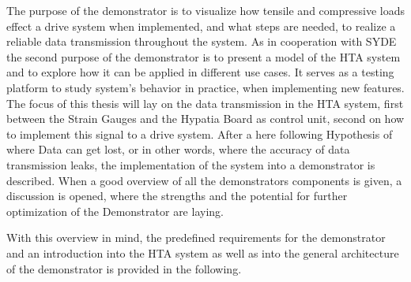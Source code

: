The purpose of the demonstrator is to visualize how tensile and compressive loads effect a drive system when implemented, and what steps are needed, to realize a reliable data transmission throughout the system. As in cooperation with SYDE \cite{SydeTechnology:2025} the second purpose of the demonstrator is to present a model of the \ac{HTA} system \cite{SydeHTA:2021} and to explore how it can be applied in different use cases. It serves as a testing platform to study system’s behavior in practice, when implementing new features.
The focus of this thesis will lay on the data transmission in the \ac{HTA} system, first between the Strain Gauges and the Hypatia Board\cite{SydeHypatia:2023} as control unit, second on how to implement this signal to a drive system. After a here following Hypothesis of where Data can get lost, or in other words, where the accuracy of data transmission leaks, the implementation of the system into a demonstrator is described. When a good overview of all the demonstrators components is given, a discussion is opened, where the strengths and the potential for further optimization of the Demonstrator are laying. 

With this overview in mind, the predefined requirements for the demonstrator and an introduction into the \ac{HTA} system as well as into the general architecture of the demonstrator is provided in the following. 
\newpage